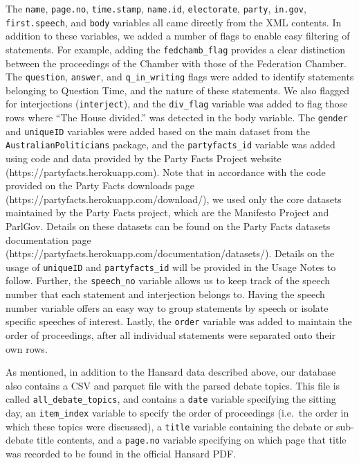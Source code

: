 \documentclass[
  letterpaper,
  DIV=11,
  numbers=noendperiod]{scrartcl}
\begin{document}
The \texttt{name}, \texttt{page.no}, \texttt{time.stamp},
\texttt{name.id}, \texttt{electorate}, \texttt{party}, \texttt{in.gov},
\texttt{first.speech}, and \texttt{body} variables all came directly
from the XML contents. In addition to these variables, we added a number
of flags to enable easy filtering of statements. For example, adding the
\texttt{fedchamb\_flag} provides a clear distinction between the
proceedings of the Chamber with those of the Federation Chamber. The
\texttt{question}, \texttt{answer}, and \texttt{q\_in\_writing} flags
were added to identify statements belonging to Question Time, and the
nature of these statements. We also flagged for interjections
(\texttt{interject}), and the \texttt{div\_flag} variable was added to
flag those rows where ``The House divided.'' was detected in the body
variable. The \texttt{gender} and \texttt{uniqueID} variables were added
based on the main dataset from the \texttt{AustralianPoliticians}
package, and the \texttt{partyfacts\_id} variable was added using code
and data provided by the Party Facts Project website
(https://partyfacts.herokuapp.com). Note that in accordance with the
code provided on the Party Facts downloads page
(https://partyfacts.herokuapp.com/download/), we used only the core
datasets maintained by the Party Facts project, which are the Manifesto
Project and ParlGov. Details on these datasets can be found on the Party
Facts datasets documentation page
(https://partyfacts.herokuapp.com/documentation/datasets/). Details on
the usage of \texttt{uniqueID} and \texttt{partyfacts\_id} will be
provided in the Usage Notes to follow. Further, the \texttt{speech\_no}
variable allows us to keep track of the speech number that each
statement and interjection belongs to. Having the speech number variable
offers an easy way to group statements by speech or isolate specific
speeches of interest. Lastly, the \texttt{order} variable was added to
maintain the order of proceedings, after all individual statements were
separated onto their own rows.

As mentioned, in addition to the Hansard data described above, our
database also contains a CSV and parquet file with the parsed debate
topics. This file is called \texttt{all\_debate\_topics}, and contains a
\texttt{date} variable specifying the sitting day, an
\texttt{item\_index} variable to specify the order of proceedings
(i.e.~the order in which these topics were discussed), a \texttt{title}
variable containing the debate or sub-debate title contents, and a
\texttt{page.no} variable specifying on which page that title was
recorded to be found in the official Hansard PDF.
\end{document}
